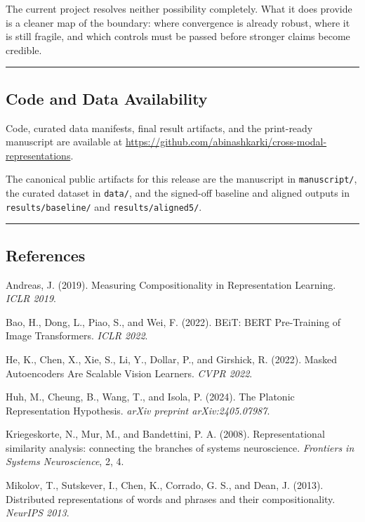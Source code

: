 \documentclass[
]{article}
\begin{document}
The current project resolves neither possibility completely. What it
does provide is a cleaner map of the boundary: where convergence is
already robust, where it is still fragile, and which controls must be
passed before stronger claims become credible.

\begin{center}\rule{0.5\linewidth}{0.5pt}\end{center}

\subsection{Code and Data
Availability}\label{code-and-data-availability}

Code, curated data manifests, final result artifacts, and the
print-ready manuscript are available at
\url{https://github.com/abinashkarki/cross-modal-representations}.

The canonical public artifacts for this release are the manuscript in
\texttt{manuscript/}, the curated dataset in \texttt{data/}, and the
signed-off baseline and aligned outputs in \texttt{results/baseline/}
and \texttt{results/aligned5/}.

\begin{center}\rule{0.5\linewidth}{0.5pt}\end{center}

\subsection{References}\label{references}

Andreas, J. (2019). Measuring Compositionality in Representation
Learning. \emph{ICLR 2019}.

Bao, H., Dong, L., Piao, S., and Wei, F. (2022). BEiT: BERT Pre-Training
of Image Transformers. \emph{ICLR 2022}.

He, K., Chen, X., Xie, S., Li, Y., Dollar, P., and Girshick, R. (2022).
Masked Autoencoders Are Scalable Vision Learners. \emph{CVPR 2022}.

Huh, M., Cheung, B., Wang, T., and Isola, P. (2024). The Platonic
Representation Hypothesis. \emph{arXiv preprint arXiv:2405.07987}.

Kriegeskorte, N., Mur, M., and Bandettini, P. A. (2008).
Representational similarity analysis: connecting the branches of systems
neuroscience. \emph{Frontiers in Systems Neuroscience}, 2, 4.

Mikolov, T., Sutskever, I., Chen, K., Corrado, G. S., and Dean, J.
(2013). Distributed representations of words and phrases and their
compositionality. \emph{NeurIPS 2013}.
\end{document}
